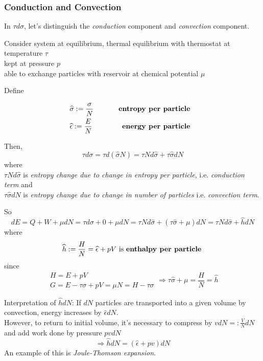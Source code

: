 \documentclass[10pt]{amsart}
\begin{document}
\begin{multicols*}{2}
\subsubsection{Conduction and Convection}\label{SubsubSec:ConductionConvection}

In $\tau d\sigma$, let's distinguish the \emph{conduction} component and \emph{convection} component.

Consider system at equilibrium, thermal equilibrium with thermostat at temperature $\tau$ \\
\qquad kept at pressure $p$ \\
\qquad able to exchange particles with reservoir at chemical potential $\mu$

Define

\[
\begin{aligned}
  & \widehat{\sigma} := \frac{ \sigma}{N } \qquad \, & \text{ \textbf{entropy per particle } } \\
  & \widehat{\epsilon} := \frac{ E}{N } \qquad \, & \text{ \textbf{energy per particle } } 
\end{aligned}
\]

Then, 
\[
\boxed{ 
\tau d\sigma = \tau d(\widehat{\sigma}N) = \tau N d\widehat{\sigma} + \tau \widehat{\sigma} dN
}
\]
where \\

$\tau N d\widehat{\sigma}$ is \emph{entropy change due to change in entropy per particle}, i.e. \emph{conduction term} and \\

$\tau \widehat{\sigma} dN$ is \emph{entropy change due to change in number of particles} i.e. \emph{ convection term}.  

So
\[
dE = Q + W + \mu dN = \tau d\sigma + 0 + \mu dN = \tau Nd\widehat{\sigma} + (\tau \widehat{\sigma} + \mu ) dN = \tau N d\widehat{\sigma} + \widehat{h} dN
\]
where
\[
\widehat{h} := \frac{H}{N} = \widehat{\epsilon} + pV \text{ is \textbf{enthalpy per particle} }
\]
since 
\[
\begin{gathered}
H = E + pV \\ 
G = E-\tau \sigma + pV = \mu N = H-\tau \sigma
\end{gathered} \Longrightarrow \tau \widehat{\sigma} + \mu = \frac{H}{N} = \widehat{h}
\]

Interpretation of $\widehat{h}dN$: If $dN$ particles are transported into a given volume by convection, energy increases by $\widehat{\epsilon}dN$.  \\
However, to return to initial volume, it's necessary to compress by $vdN =: \frac{V}{N}dN$ and add work done by pressure $pvdN$
\[
\Longrightarrow \widehat{h}dN = (\widehat{\epsilon} + pv)dN
\]
An example of this is \emph{Joule-Thomson expansion}.  


\end{multicols*}
\end{document}
